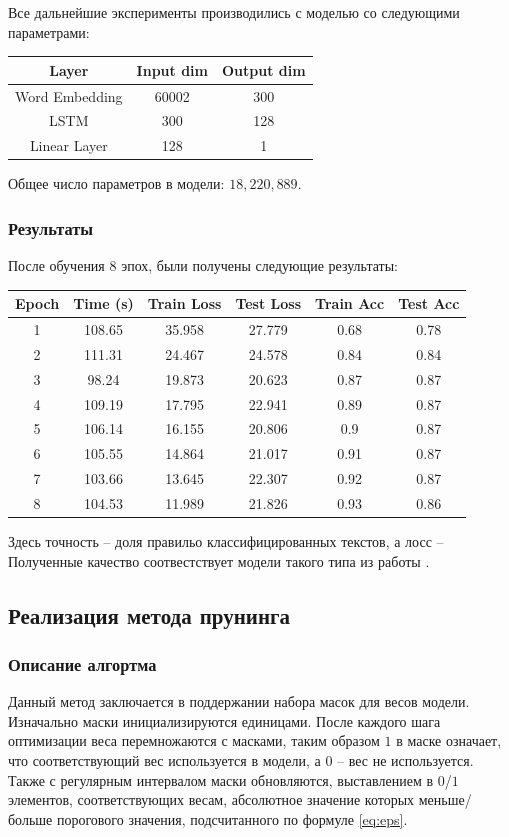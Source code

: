 \documentclass[12pt]{article}
\begin{document}
Все дальнейшие эксперименты производились с моделью со следующими параметрами:
\begin{center}
  \begin{tabular}{ c  c  c }
    \hline
    Layer & Input dim & Output dim \\ \hline
    Word Embedding & 60002 & 300 \\
    LSTM & 300 & 128 \\
    Linear Layer & 128 & 1 \\ \hline
  \end{tabular}
\end{center}

Общее число параметров в модели: $18,220,889$.
\subsubsection*{Результаты}
После обучения $8$ эпох, были получены следующие результаты:

\begin{center}
\begin{tabular}{cccccc}
  \hline
  Epoch & Time (s) & Train Loss & Test Loss & Train Acc & Test Acc \\ \hline
  1 & 108.65 & 35.958 & 27.779 & 0.68 & 0.78 \\
  2 & 111.31 & 24.467 & 24.578 & 0.84 & 0.84 \\
  3 & 98.24 & 19.873 & 20.623 & 0.87 & 0.87 \\
  4 & 109.19 & 17.795 & 22.941 & 0.89 & 0.87 \\
  5 & 106.14 & 16.155 & 20.806 & 0.9 & 0.87 \\
  6 & 105.55 & 14.864 & 21.017 & 0.91 & 0.87 \\
  7 & 103.66 & 13.645 & 22.307 & 0.92 & 0.87 \\
  8 & 104.53 & 11.989 & 21.826 & 0.93 & 0.86 \\ \hline
\end{tabular}
\end{center}

Здесь точность -- доля правильо классифицированных текстов, а лосс --  Полученные качество соотвестствует модели такого типа из работы \cite{stanfordrep}.

\subsection*{Реализация метода прунинга}
%
\subsubsection*{Описание алгортма}
Данный метод заключается в поддержании набора масок для весов модели. Изначально 
маски инициализируются единицами. После каждого шага оптимизации веса перемножаются 
с масками, таким образом $1$ в маске означает, что соответствующий вес используется в модели, а $0$ -- вес не используется. Также с регулярным интервалом маски обновляются, выставлением в $0$/$1$ элементов,
соответствующих весам, абсолютное значение которых меньше/больше порогового значения, подсчитанного 
по формуле \ref{eq:eps}.
\end{document}
